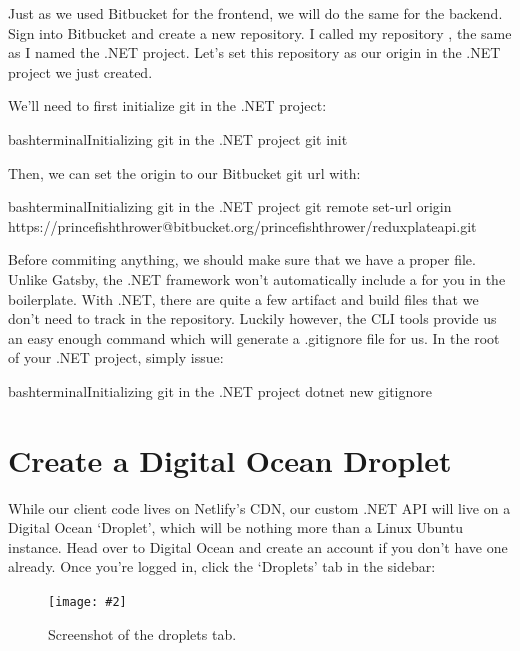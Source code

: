 \documentclass[paper=6in:9in,pagesize=pdftex,headinclude=on,footinclude=on,12pt,twoside]{scrbook}
\newcommand{\standardfigure}[3]{\begin{figure}[H]\begin{center}\texttt{[image: \#2]}\caption{#3}\label{fig:#2}\end{center}\end{figure}}
\begin{document}
Just as we used Bitbucket for the frontend, we will do the same for the backend. Sign into Bitbucket and create a new repository. I called my repository , the same as I named the .NET project. Let's set this repository as our origin in the .NET project we just created.


We'll need to first initialize git in the .NET project:

\begin{codeInput}{bash}{terminal}{Initializing git in the .NET project}
git init
\end{codeInput}

Then, we can set the origin to our Bitbucket git url with:

\begin{codeInput}{bash}{terminal}{Initializing git in the .NET project}
git remote set-url origin https://princefishthrower@bitbucket.org/princefishthrower/reduxplateapi.git
\end{codeInput}


Before commiting anything, we should make sure that we have a proper  file. Unlike Gatsby, the .NET framework won't automatically include a  for you in the boilerplate. With .NET, there are quite a few artifact and build files that we don't need to track in the repository. Luckily however, the  CLI tools provide us an easy enough command which will generate a .gitignore file for us. In the root of your .NET project, simply issue:

\begin{codeInput}{bash}{terminal}{Initializing git in the .NET project}
dotnet new gitignore
\end{codeInput}

\section{Create a Digital Ocean Droplet}

While our client code lives on Netlify's CDN, our custom .NET API will live on a Digital Ocean `Droplet', which will be nothing more than a Linux Ubuntu instance. Head over to Digital Ocean and create an account if you don't have one already. Once you're logged in, click the `Droplets' tab in the sidebar:

\standardfigure{\textwidth/2}{droplet/droplets-tab}{Screenshot of the droplets tab.}
\end{document}

